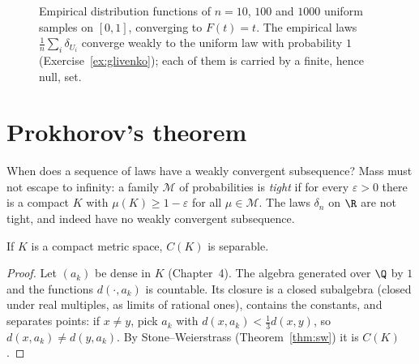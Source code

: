 \begin{figure}[ht]
\centering
{}
\caption{Empirical distribution functions of $n=10$, $100$ and $1000$ uniform samples on $[0,1]$, converging to $F(t)=t$. The empirical laws $\frac1n\sum_i\delta_{U_i}$ converge weakly to the uniform law with probability
$1$ (Exercise~\ref{ex:glivenko}); each of them is carried by a finite, hence null, set.}
\label{fig:empirical}
\end{figure}

\section{Prokhorov's theorem}

When does a sequence of laws have a weakly convergent subsequence? Mass must not escape to infinity: a family $\mathcal M$ of probabilities is \emph{tight} if for every $\varepsilon>0$ there is a compact $K$ with $\mu(K)\ge1-\varepsilon$ for all
$\mu\in\mathcal M$. The laws $\delta_n$ on $\R$ are not tight, and indeed have no weakly convergent subsequence.

\begin{lemma}\label{lem:separable}
If $K$ is a compact metric space, $C(K)$ is separable.
\end{lemma}
\begin{proof}
Let $(a_k)$ be dense in $K$ (Chapter~4). The algebra generated over $\Q$ by $1$ and the functions $d(\cdot,a_k)$ is countable. Its closure is a closed subalgebra (closed under real multiples, as limits of rational ones),
contains the constants, and separates points: if $x\ne y$, pick $a_k$ with $d(x,a_k)<\frac13d(x,y)$, so $d(x,a_k)\ne d(y,a_k)$. By Stone--Weierstrass (Theorem~\ref{thm:sw}) it is $C(K)$.
\end{proof}

